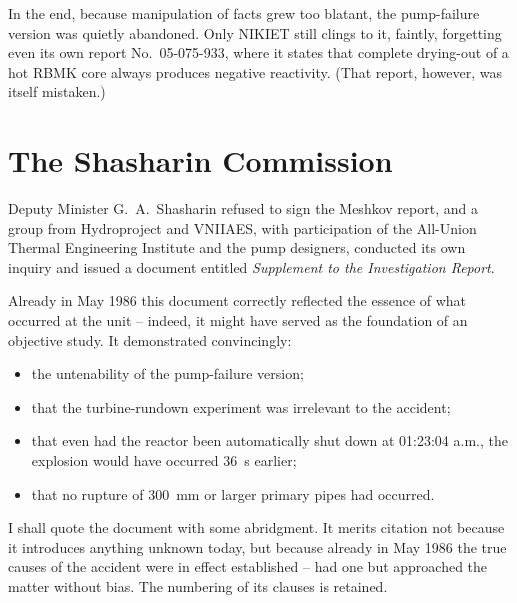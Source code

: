 \documentclass[openright]{bookest}
\begin{document}
In the end, because manipulation of facts grew too blatant, the pump-failure version was quietly abandoned. Only NIKIET still clings to it, faintly, forgetting even its own report No.~05-075-933, where it states that complete drying-out of a hot RBMK core always produces negative reactivity. (That report, however, was itself mistaken.)

\section{The Shasharin Commission}

Deputy Minister G.~A.~Shasharin refused to sign the Meshkov report, and a group from Hydroproject and VNIIAES, with participation of the All-Union Thermal Engineering Institute and the pump designers, conducted its own inquiry and issued a document entitled \textit{Supplement to the Investigation Report}.

Already in May 1986 this document correctly reflected the essence of what occurred at the unit -- indeed, it might have served as the foundation of an objective study. It demonstrated convincingly:

\begin{itemize}
\item the untenability of the pump-failure version;
\item that the turbine-rundown experiment was irrelevant to the accident;
\item that even had the reactor been automatically shut down at 01:23:04 a.m., the explosion would have occurred \qty{36}{\second} earlier;
\item that no rupture of \qty{300}{\milli\metre} or larger primary pipes had occurred.
\end{itemize}

I shall quote the document with some abridgment. It merits citation not because it introduces anything unknown today, but because already in May 1986 the true causes of the accident were in effect established -- had one but approached the matter without bias. The numbering of its clauses is retained.
\end{document}
